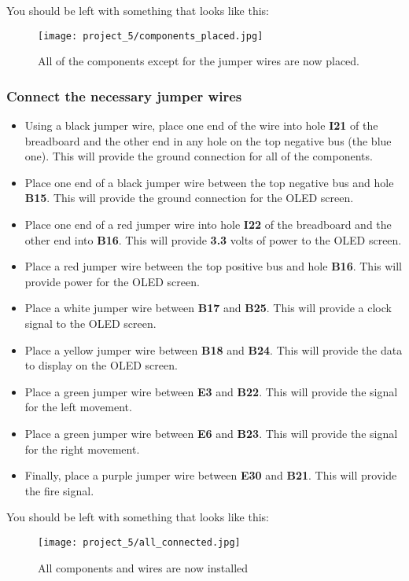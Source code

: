 You should be left with something that looks like this:
\begin{figure}[H]
    \centering
    \texttt{[image: project\_5/components\_placed.jpg]}
    \caption{All of the components except for the jumper wires are now placed.}
\end{figure}

\subsubsection{Connect the necessary jumper wires}
\begin{itemize}
    \item Using a black jumper wire, place one end of the wire into hole \textbf{I21} of the breadboard and the other
    end in any hole on the top negative bus (the blue one). This will provide the ground connection for all of the components.
    \item Place one end of a black jumper wire between the top negative bus and hole \textbf{B15}. This will provide the ground connection
    for the OLED screen.
    \item Place one end of a red jumper wire into hole \textbf{I22} of the breadboard and the other end into
    \textbf{B16}. This will provide \textbf{3.3} volts of power to the OLED screen.
    \item Place a red jumper wire between the top positive bus and hole \textbf{B16}. This will provide power for the OLED screen.
    \item Place a white jumper wire between \textbf{B17} and \textbf{B25}. This will provide a clock signal to the OLED screen.
    \item Place a yellow jumper wire between \textbf{B18} and \textbf{B24}. This will provide the data to display on the OLED screen.
    \item Place a green jumper wire between \textbf{E3} and \textbf{B22}. This will provide the signal for the left movement.
    \item Place a green jumper wire between \textbf{E6} and \textbf{B23}. This will provide the signal for the right movement.
    \item Finally, place a purple jumper wire between \textbf{E30} and \textbf{B21}. This will provide the fire signal.
\end{itemize}

You should be left with something that looks like this:
\begin{figure}[H]
    \centering
    \texttt{[image: project\_5/all\_connected.jpg]}
    \caption{All components and wires are now installed}
\end{figure}

